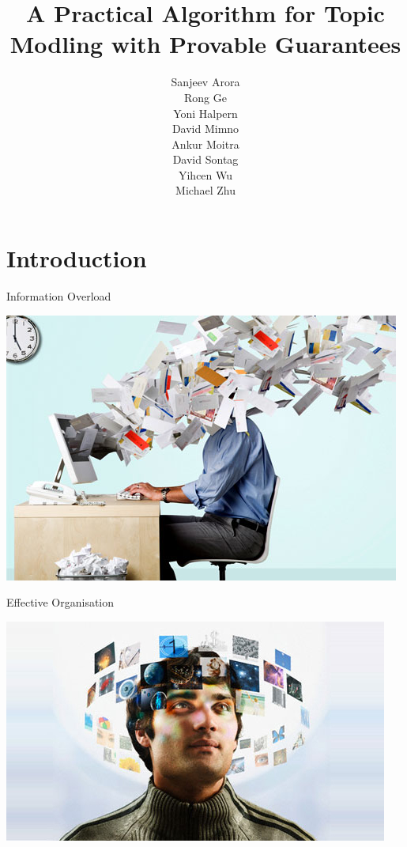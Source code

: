 \documentclass{lecture}
\title{A Practical Algorithm for Topic Modling with Provable Guarantees}
\author[Vanush \& Kristy]{Sanjeev Arora\\
		Rong Ge\\
		Yoni Halpern\\
		David Mimno\\
		Ankur Moitra\\
		David Sontag\\
		Yihcen Wu\\
		Michael Zhu}
\institute[\textschwa-lab]{Presented by: Vanush Vaswani and Kristy Hughes}
\date{}
\begin{document}
\AtBeginSection[]
{
  \begin{frame}
    \tableofcontents[currentsection]
  \end{frame}
}

\titleslide

\section[Intro]{Introduction}

\begin{plain}{Information Overload}
\vspace{-2ex}
\begin{center}
\includegraphics[scale=0.6]{figs/messy}
\end{center}
\end{plain}

\begin{plain}{Effective Organisation}
\vspace{-4ex}
\begin{center}
\includegraphics[scale=0.65]{figs/organised}
\end{center}
\end{plain}
\end{document}
